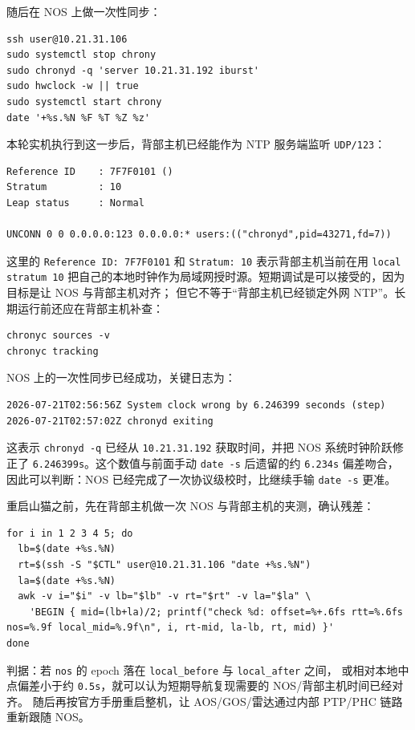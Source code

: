 \documentclass[UTF8,11pt,a4paper]{ctexart}
\begin{document}
随后在 NOS 上做一次性同步：

\begin{verbatim}
ssh user@10.21.31.106
sudo systemctl stop chrony
sudo chronyd -q 'server 10.21.31.192 iburst'
sudo hwclock -w || true
sudo systemctl start chrony
date '+%s.%N %F %T %Z %z'
\end{verbatim}

本轮实机执行到这一步后，背部主机已经能作为 NTP 服务端监听 \texttt{UDP/123}：

\begin{verbatim}
Reference ID    : 7F7F0101 ()
Stratum         : 10
Leap status     : Normal

UNCONN 0 0 0.0.0.0:123 0.0.0.0:* users:(("chronyd",pid=43271,fd=7))
\end{verbatim}

这里的 \texttt{Reference ID: 7F7F0101} 和 \texttt{Stratum: 10} 表示背部主机当前在用
\texttt{local stratum 10} 把自己的本地时钟作为局域网授时源。短期调试是可以接受的，因为目标是让 NOS 与背部主机对齐；
但它不等于“背部主机已经锁定外网 NTP”。长期运行前还应在背部主机补查：

\begin{verbatim}
chronyc sources -v
chronyc tracking
\end{verbatim}

NOS 上的一次性同步已经成功，关键日志为：

\begin{verbatim}
2026-07-21T02:56:56Z System clock wrong by 6.246399 seconds (step)
2026-07-21T02:57:02Z chronyd exiting
\end{verbatim}

这表示 \texttt{chronyd -q} 已经从 \texttt{10.21.31.192} 获取时间，并把 NOS 系统时钟阶跃修正了
\texttt{6.246399s}。这个数值与前面手动 \texttt{date -s} 后遗留的约 \texttt{6.234s} 偏差吻合，
因此可以判断：NOS 已经完成了一次协议级校时，比继续手输 \texttt{date -s} 更准。

重启山猫之前，先在背部主机做一次 NOS 与背部主机的夹测，确认残差：

\begin{verbatim}
for i in 1 2 3 4 5; do
  lb=$(date +%s.%N)
  rt=$(ssh -S "$CTL" user@10.21.31.106 "date +%s.%N")
  la=$(date +%s.%N)
  awk -v i="$i" -v lb="$lb" -v rt="$rt" -v la="$la" \
    'BEGIN { mid=(lb+la)/2; printf("check %d: offset=%+.6fs rtt=%.6fs nos=%.9f local_mid=%.9f\n", i, rt-mid, la-lb, rt, mid) }'
done
\end{verbatim}

判据：若 \texttt{nos} 的 epoch 落在 \texttt{local\_before} 与 \texttt{local\_after} 之间，
或相对本地中点偏差小于约 \texttt{0.5s}，就可以认为短期导航复现需要的 NOS/背部主机时间已经对齐。
随后再按官方手册重启整机，让 AOS/GOS/雷达通过内部 PTP/PHC 链路重新跟随 NOS。
\end{document}
